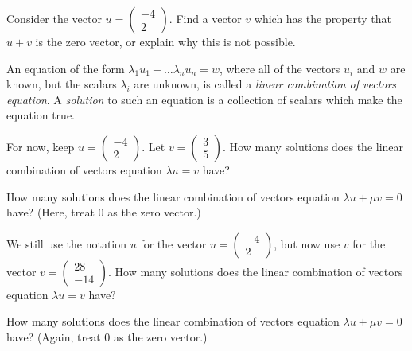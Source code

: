 \documentclass[cahier-main.tex]{subfiles}
\begin{document}
\begin{task}
Consider the vector $u = \left(\begin{smallmatrix} -4 \\ 2\end{smallmatrix}\right)$. Find a vector $v$ which has the property that $u+v$ is the zero vector, or explain why this is not possible.
\end{task}

\begin{definition}
An equation of the form $\lambda_1 u_1 + \dots \lambda_n u_n = w$, where all of the vectors $u_i$ and $w$ are known, but the scalars $\lambda_i$ are unknown, is called a \emph{linear combination of vectors equation}.
A \emph{solution} to such an equation is 
a collection of scalars which make the equation true.
\end{definition}

\begin{task}
For now, keep $u = \left(\begin{smallmatrix} -4 \\ 2\end{smallmatrix}\right)$. 
Let $v = \left(\begin{smallmatrix} 3 \\ 5 \end{smallmatrix}\right)$.
How many solutions does the linear combination of vectors equation
$\lambda u = v$
have?

How many solutions does the linear combination of vectors equation 
$\lambda u + \mu v = 0$
have? (Here, treat $0$ as the zero vector.)
\end{task}

\begin{task}
We still use the notation $u$ for the vector $u = \left(\begin{smallmatrix} -4 \\ 2\end{smallmatrix}\right)$, but now use $v$ for the vector $v = \left(\begin{smallmatrix} 28 \\ -14\end{smallmatrix}\right)$.
How many solutions does the linear combination of vectors equation $\lambda u = v$
have?

How many solutions does the linear combination of vectors equation 
$\lambda u + \mu v = 0$ have? (Again, treat $0$ as the zero vector.)
\end{task}
\end{document}
